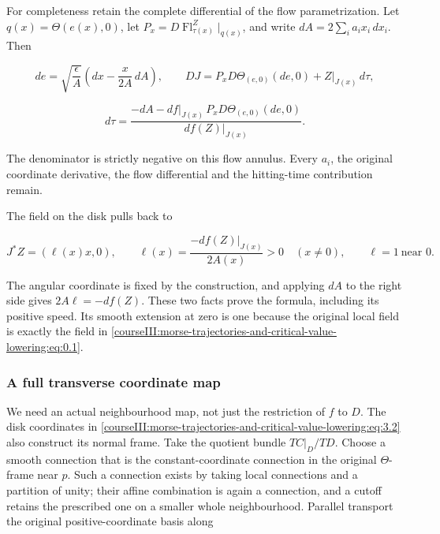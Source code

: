 For completeness retain the complete differential of the flow parametrization. Let
\(q(x)=\Theta(e(x),0)\), let \(P_x=D\operatorname{Fl}^Z_{\tau(x)}|_{q(x)}\), and write \(dA=2\sum_i a_i x_i\,dx_i\). Then

\begin{equation}
de=\sqrt{\frac{\epsilon}{A}}
       \left(dx-\frac{x}{2A}\,dA\right),
 \qquad
 DJ=P_xD\Theta_{(e,0)}(de,0)+Z|_{J(x)}\,d\tau,
 \label{courseIII:morse-trajectories-and-critical-value-lowering:eq:3.4}
\end{equation}

\begin{equation}
d\tau=
 \frac{-dA-df|_{J(x)}\,P_xD\Theta_{(e,0)}(de,0)}
      {df(Z)|_{J(x)}}.
 \label{courseIII:morse-trajectories-and-critical-value-lowering:eq:3.5}
\end{equation}

The denominator is strictly negative on this flow annulus. Every \(a_i\), the original coordinate derivative, the flow differential and the hitting-time contribution remain.

The field on the disk pulls back to

\begin{equation}
J^*Z=(\ell(x)x,0),\qquad
 \ell(x)=\frac{-df(Z)|_{J(x)}}{2A(x)}>0
 \quad(x\ne0),\qquad \ell=1\ \text{near }0.
 \label{courseIII:morse-trajectories-and-critical-value-lowering:eq:3.6}
\end{equation}

The angular coordinate is fixed by the construction, and applying \(dA\) to the right side gives \(2A\ell=-df(Z)\). These two facts prove the formula, including its positive speed. Its smooth extension at zero is one because the original local field is exactly the field in \eqref{courseIII:morse-trajectories-and-critical-value-lowering:eq:0.1}.

\subsubsection{A full transverse coordinate map}
\label{courseIII:morse-trajectories-and-critical-value-lowering:section-3.1}

We need an actual neighbourhood map, not just the restriction of \(f\) to \(D\). The disk coordinates in \eqref{courseIII:morse-trajectories-and-critical-value-lowering:eq:3.2} also construct its normal frame. Take the quotient bundle \(TC|_D/TD\). Choose a smooth connection that is the constant-coordinate connection in the original \(\Theta\)-frame near \(p\). Such a connection exists by taking local connections and a partition of unity; their affine combination is again a connection, and a cutoff retains the prescribed one on a smaller whole neighbourhood. Parallel transport the original positive-coordinate basis along

